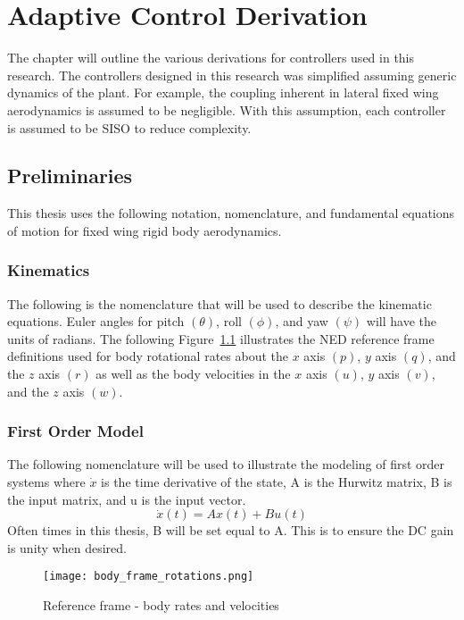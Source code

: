 \chapter{Adaptive Control Derivation}\label{ch:derivation}

The chapter will outline the various derivations for controllers used in this research.  The controllers designed in this research was simplified assuming generic dynamics of the plant.  For example, the coupling inherent in lateral fixed wing aerodynamics is assumed to be negligible.  With this assumption, each controller is assumed to be \ac{SISO} to reduce complexity.

\section{Preliminaries}\label{preliminaries}
This thesis uses the following notation, nomenclature, and fundamental equations of motion for fixed wing rigid body aerodynamics.

\subsection{Kinematics}
The following is the nomenclature that will be used to describe the kinematic equations.  Euler angles for pitch $(\theta)$, roll $(\phi)$, and yaw $(\psi)$ will have the units of radians.  The following Figure~\ref{fig:reference_frame} illustrates the \ac{NED} reference frame definitions used for body rotational rates about the $x$ axis $(p)$, $y$ axis $(q)$, and the $z$ axis $(r)$ as well as the body velocities in the $x$ axis $(u)$, $y$ axis $(v)$, and the $z$ axis $(w)$.

\subsection{First Order Model}
The following nomenclature will be used to illustrate the modeling of first order systems where $\dot{x}$ is the time derivative of the state, A is the Hurwitz matrix, B is the input matrix, and u is the input vector.
\begin{equation}
\dot{x}(t)=Ax(t)+Bu(t)
\end{equation}
Often times in this thesis, B will be set equal to A.  This is to ensure the DC gain is unity when desired.

\begin{figure}[!h]
 \centering
  \texttt{[image: body\_frame\_rotations.png]}
  \caption{Reference frame - body rates and velocities}
  \label{fig:reference_frame}
\end{figure}

